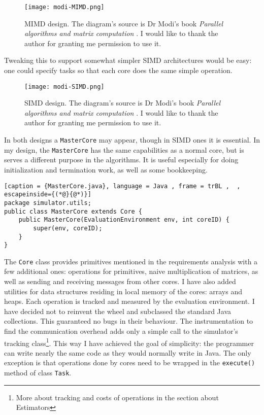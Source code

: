\documentclass[12pt,a4paper,oneside,openright]{report}
\begin{document}
\begin{figure}[h]
    \centering
  \caption{MIMD design. The diagram's source is Dr Modi's book \textit{Parallel algorithms and matrix computation} \cite{modibook}. I would like to thank the author for granting me permission to use it.}
  \texttt{[image: modi-MIMD.png]}
\end{figure}

Tweaking this to support somewhat simpler SIMD architectures would be easy: one could specify tasks so that each core does the same simple operation. 

\begin{figure}[h]
  \centering
  \caption{SIMD design. The diagram's source is Dr Modi's book \textit{Parallel algorithms and matrix computation} \cite{modibook}. I would like to thank the author for granting me permission to use it.}
  \texttt{[image: modi-SIMD.png]}
\end{figure}

In both designs a \texttt{MasterCore} may appear, though in SIMD ones it is essential. In my design, the \texttt{MasterCore} has the same capabilities as a normal core, but is serves a different purpose in the algorithms. It is useful especially for doing initialization and termination work, as well as some bookkeeping.

\begin{lstlisting}[caption = {MasterCore.java}, language = Java , frame = trBL ,  , escapeinside={(*@}{@*)}]
package simulator.utils;
public class MasterCore extends Core {
    public MasterCore(EvaluationEnvironment env, int coreID) {
        super(env, coreID);
    }
}
\end{lstlisting}

The \texttt{Core} class provides primitives mentioned in the requirements analysis with a few additional ones: operations for primitives, naive multiplication of matrices, as well as sending and receiving messages from other cores. I have also added utilities for data structures residing in local memory of the cores: arrays and heaps. Each operation is tracked and measured by the evaluation environment. I have decided not to reinvent the wheel and subclassed the standard Java collections. This guaranteed no bugs in their behaviour. The instrumentation to find the communication overhead adds only a simple call to the simulator's tracking class\footnote{More about tracking and costs of operations in the section about Estimators}. This way I have achieved the goal of simplicity: the programmer can write nearly the same code as they would normally write in Java. The only exception is that operations done by cores need to be wrapped in the \texttt{execute()} method of class \texttt{Task}.
\end{document}
